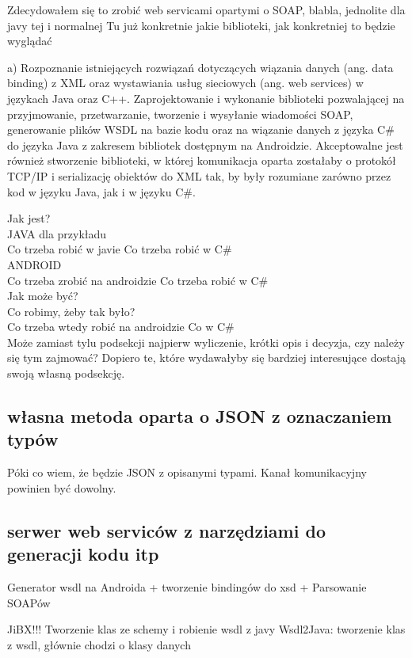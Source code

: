 \documentclass[twoside,a4paper]{book}
\begin{document}
Zdecydowałem się to zrobić web servicami opartymi o SOAP, blabla, jednolite dla javy tej i normalnej
Tu już konkretnie jakie biblioteki, jak konkretniej to będzie wyglądać

a)	Rozpoznanie istniejących rozwiązań dotyczących wiązania danych (ang. data binding) z XML oraz wystawiania usług sieciowych (ang. web services) w językach Java oraz C++.
Zaprojektowanie i wykonanie biblioteki pozwalającej na przyjmowanie, przetwarzanie, tworzenie i wysyłanie wiadomości SOAP, generowanie plików WSDL na bazie kodu oraz na wiązanie danych z języka C\# do języka Java z zakresem bibliotek dostępnym na Androidzie. Akceptowalne jest również stworzenie biblioteki, w której komunikacja oparta zostałaby o protokół TCP/IP i serializację obiektów do XML tak, by były rozumiane zarówno przez kod w języku Java, jak i w języku C\#.

Jak jest? \\
JAVA dla przykładu \\
Co trzeba robić w javie			Co trzeba robić w C\# \\
ANDROID \\
Co trzeba zrobić na androidzie		Co trzeba robić w C\# \\

Jak może być? \\
Co robimy, żeby tak było? \\
Co trzeba wtedy robić na androidzie	Co w C\# \\

Może zamiast tylu podsekcji najpierw wyliczenie, krótki opis i decyzja, czy należy się tym zajmować? Dopiero te, które wydawałyby się bardziej interesujące dostają swoją własną podsekcję.

\subsection{własna metoda oparta o JSON z oznaczaniem typów}
Póki co wiem, że będzie JSON z opisanymi typami. Kanał komunikacyjny powinien być dowolny. 

\subsection{serwer web serviców z narzędziami do generacji kodu itp}
Generator wsdl na Androida + tworzenie bindingów do xsd + Parsowanie SOAPów

JiBX!!! Tworzenie klas ze schemy i robienie wsdl z javy
Wsdl2Java: tworzenie klas z wsdl, głównie chodzi o klasy danych
\end{document}
